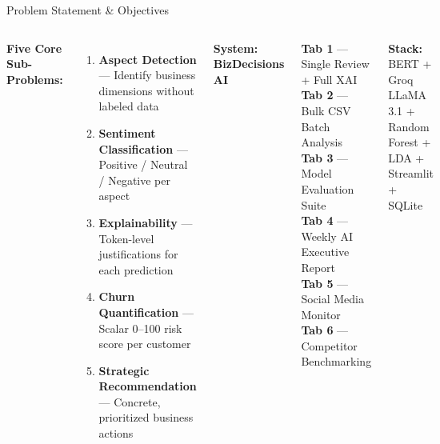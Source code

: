 \documentclass[aspectratio=169]{beamer}
\begin{document}
\begin{frame}{Problem Statement \& Objectives}
  \begin{columns}[T]
      \textbf{\color{navyblue}Five Core Sub-Problems:}
      \vspace{0.15cm}
      \begin{enumerate}
        \item[\textcolor{accentblue}{\textbf{1}}]
          \textbf{Aspect Detection} --- Identify business dimensions without labeled data
        \item[\textcolor{accentblue}{\textbf{2}}]
          \textbf{Sentiment Classification} --- Positive / Neutral / Negative per aspect
        \item[\textcolor{accentblue}{\textbf{3}}]
          \textbf{Explainability} --- Token-level justifications for each prediction
        \item[\textcolor{accentblue}{\textbf{4}}]
          \textbf{Churn Quantification} --- Scalar 0--100 risk score per customer
        \item[\textcolor{accentblue}{\textbf{5}}]
          \textbf{Strategic Recommendation} --- Concrete, prioritized business actions
      \end{enumerate}
      \textbf{\color{navyblue}System: BizDecisions AI}
      \vspace{0.15cm}
      \begin{tcolorbox}[colback=navyblue!6, colframe=accentblue, arc=4pt, boxrule=1pt]
        \small
        \textcolor{navyblue}{\faTabletAlt} \textbf{Tab 1} --- Single Review + Full XAI\\[3pt]
        \textcolor{navyblue}{\faFileAlt}   \textbf{Tab 2} --- Bulk CSV Batch Analysis\\[3pt]
        \textcolor{navyblue}{\faChartBar}  \textbf{Tab 3} --- Model Evaluation Suite\\[3pt]
        \textcolor{navyblue}{\faCalendar}  \textbf{Tab 4} --- Weekly AI Executive Report\\[3pt]
        \textcolor{navyblue}{\faWifi}      \textbf{Tab 5} --- Social Media Monitor\\[3pt]
        \textcolor{navyblue}{\faTrophy}    \textbf{Tab 6} --- Competitor Benchmarking
      \end{tcolorbox}
      \vspace{0.2cm}
      \begin{greenbox}
        \small\textbf{Stack:} BERT + Groq LLaMA 3.1 + Random Forest + LDA +
        Streamlit + SQLite
      \end{greenbox}
  \end{columns}
\end{frame}
\end{document}
